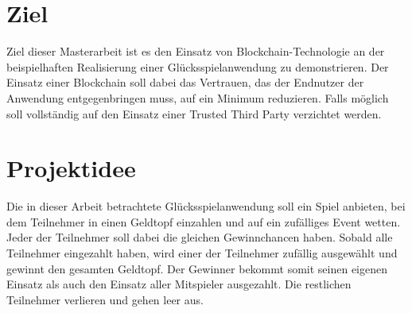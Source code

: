 \section{Ziel}
Ziel dieser Masterarbeit ist es den Einsatz von Blockchain-Technologie an der beispielhaften Realisierung einer Glücksspielanwendung zu demonstrieren. Der Einsatz einer Blockchain soll dabei das Vertrauen, das der Endnutzer der Anwendung entgegenbringen muss, auf ein Minimum reduzieren. Falls möglich soll vollständig auf den Einsatz einer Trusted Third Party verzichtet werden.


\section{Projektidee}
Die in dieser Arbeit betrachtete Glücksspielanwendung soll ein Spiel anbieten, bei dem Teilnehmer in einen Geldtopf einzahlen und auf ein zufälliges Event wetten. Jeder der Teilnehmer soll dabei die gleichen Gewinnchancen haben. Sobald alle Teilnehmer eingezahlt haben, wird einer der Teilnehmer zufällig ausgewählt und gewinnt den gesamten Geldtopf. Der Gewinner bekommt somit seinen eigenen Einsatz als auch den Einsatz aller Mitspieler ausgezahlt. Die restlichen Teilnehmer verlieren und gehen leer aus.\\\\


